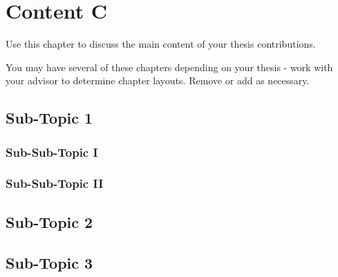 \chapter{Content C}

Use this chapter to discuss the main content of your thesis contributions.

You may have several of these chapters depending on your thesis - work with your advisor to determine chapter layouts. Remove or add as necessary.

\section{Sub-Topic 1}
\subsection{Sub-Sub-Topic I}
\subsection{Sub-Sub-Topic II}
\section{Sub-Topic 2}
\section{Sub-Topic 3}
